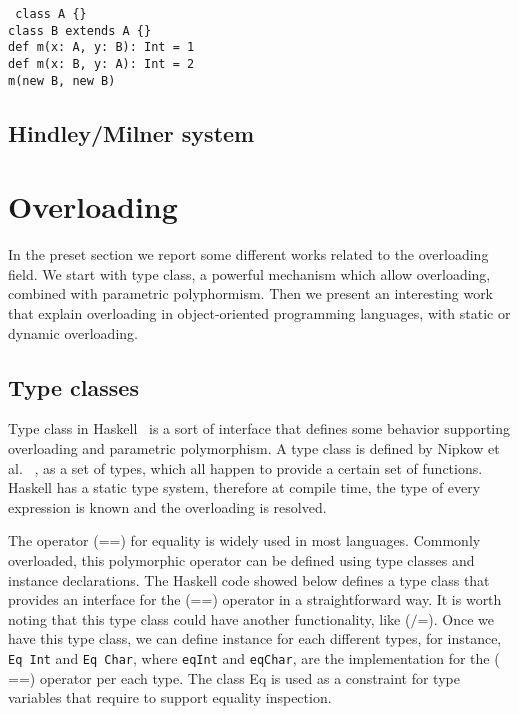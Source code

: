 \documentclass[hidelinks, twocolumn]{article}
\begin{document}
\texttt{
class A \{\} \\
class B extends A \{\} \\
def m(x: A, y: B): Int = 1\\
def m(x: B, y: A): Int = 2\\
m(new B, new B)\\ }

\subsection{Hindley/Milner system}

\section{Overloading}\label{section:polymorphism}
In the preset section we report some different works related to the overloading field. We start with type class, a powerful mechanism which allow overloading, combined with parametric polyphormism. Then we present an interesting work that explain overloading in object-oriented programming languages, with static or dynamic overloading.
\subsection{Type classes}
Type class in Haskell~\cite{wadlerBlott:popl89} is a sort of interface that defines some behavior supporting overloading and parametric polymorphism. A type class is defined by Nipkow et al.~\cite{Nipkow1993}	, as a set of types, which all happen to provide a certain set of functions. Haskell has a static type system, therefore at compile time, the type of every expression is known and the overloading  is resolved. 

The operator ($\texttt{==}$) for equality is widely used in most languages. Commonly overloaded, this polymorphic operator can be defined using type classes and instance declarations. The Haskell code showed below defines a type class that provides an interface for the ($\texttt{==}$) operator in a straightforward way. It is worth noting that this type class could have another functionality, like ($\texttt{/=}$). Once we have this type class, we can define instance for each different types, for instance,  \texttt{Eq Int} and \texttt{Eq Char}, where \texttt{eqInt} and \texttt{eqChar}, are the implementation for the ($\texttt{==}$) operator per each type. The class Eq is used as a constraint for  type variables  that require to support equality inspection.\\
\end{document}
